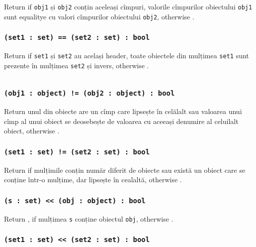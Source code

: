 Return \true{} if \texttt{obj1} și \texttt{obj2} conțin aceleași cîmpuri, valorile cîmpurilor obiectului \texttt{obj1} sunt equalitye cu valori cîmpurilor obiectului \texttt{obj2}, otherwise \false{}.

\subsubsection{\texttt{(set1 : set) == (set2 : set) : bool}}

Return \true{} if \texttt{set1} și \texttt{set2} au același header, toate obiectele din mulțimea \texttt{set1} sunt prezente în mulțimea \texttt{set2} și invers, otherwise \false{}.

\begin{sourcecode}
    \label{setobjopex}
    \inputminted[linenos]{icl}{../sources/setobjopex.icL}
\end{sourcecode}

\subsubsection{\texttt{(obj1 : object) != (obj2 : object) : bool}}

Return \true{} unul din obiecte are un cîmp care lipsește în celălalt sau valoarea unui cîmp al unui obiect se deosebește de valoarea cu aceeași denumire al celuilalt obiect, otherwise \false{}.

\subsubsection{\texttt{(set1 : set) != (set2 : set) : bool}}

Return \true{} if mulțimile conțin număr diferit de obiecte sau există un obiect care se conține într-o mulțime, dar lipsește în cealaltă, otherwise \false{}.

\subsubsection{\texttt{(s : set) << (obj : object) : bool}}

Return \true{}, if mulțimea \texttt{s} conține obiectul \texttt{obj}, otherwise \false{}.

\subsubsection{\texttt{(set1 : set) << (set2 : set) : bool}}

